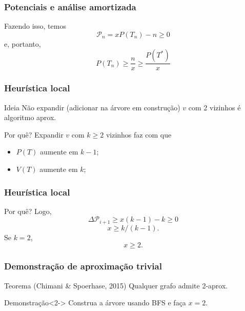 \documentclass[14pt]{beamer}
\begin{document}
\begin{frame}
\frametitle{Potenciais e an\'alise amortizada}
Fazendo isso, temos
\begin{equation}
\mathcal{P}_n = xP(T_n) - n \ge 0
\end{equation}
e, portanto,
\begin{equation}
P(T_n) \ge \frac{n}{x} \ge \frac{P(T^*)}{x}
\end{equation}
\end{frame}

\begin{frame}
\frametitle{Heur\'istica local}
\begin{block}{Ideia}
N\~ao expandir (adicionar na \'arvore em constru\c{c}\~ao) $v$ com 2 vizinhos \'e algoritmo aprox.
\end{block}
\pause
\begin{block}{Por qu\^e?}
Expandir $v$ com $k \ge 2$ vizinhos faz com que
\begin{itemize}
\item $P(T)$ aumente em $k - 1$;
\item $V(T)$ aumente em $k$;
\end{itemize}
\end{block}
\end{frame}

\begin{frame}
\frametitle{Heur\'istica local}
\begin{block}{Por qu\^e?}
Logo,
\begin{equation}
\Delta \mathcal{P}_{i + 1} \ge x(k - 1) - k \ge 0
\end{equation}
\begin{equation}
x \ge k/(k - 1).
\end{equation}
\pause
Se $k = 2$,
\begin{equation}
x \ge 2.
\end{equation}
\end{block}
\end{frame}

\begin{frame}
\frametitle{Demonstra\c{c}\~ao de aproxima\c{c}\~ao trivial}
\begin{block}{Teorema (Chimani \& Spoerhase, 2015)}
Qualquer grafo admite 2-aprox.
\end{block}

\begin{block}{Demonstra\c{c}\~ao}<2->
Construa a \'arvore usando BFS e fa\c{c}a $x = 2$.
\end{block}
\end{frame}
\end{document}

